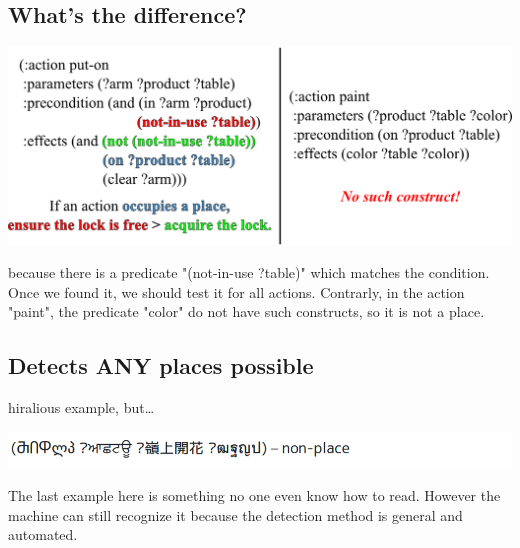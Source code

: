 \subsection{What's the difference?}
\label{sec-7-4}
\includegraphics[width=\textwidth]{img/place-non-place2.png}

\begin{resume}
because there is a predicate "(not-in-use ?table)" which matches the condition.
Once we found it, we should test it for all actions.
Contrarly, in the action "paint", the predicate "color" do not have such
constructs, so it is not a place.
\end{resume}

\subsection{Detects ANY places possible}
\label{sec-7-5}


hiralious example, but\ldots{}

\includegraphics[width=\textwidth]{img/static/hiralious.png}

\begin{resume}

The last example here is something no one even know how to read.
However the machine can still recognize it
because the detection method is general and automated.
\end{resume}

